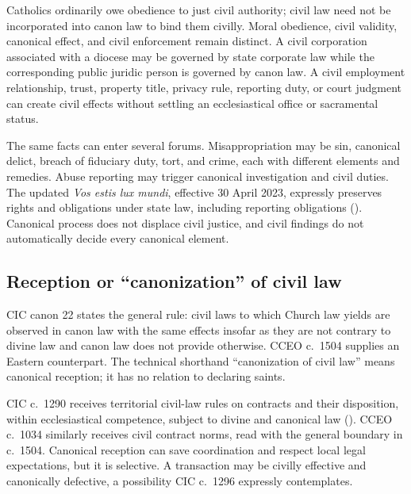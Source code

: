 Catholics ordinarily owe obedience to just civil authority; civil law need not be incorporated into canon law to bind them civilly. Moral obedience, civil validity, canonical effect, and civil enforcement remain distinct. A civil corporation associated with a diocese may be governed by state corporate law while the corresponding public juridic person is governed by canon law. A civil employment relationship, trust, property title, privacy rule, reporting duty, or court judgment can create civil effects without settling an ecclesiastical office or sacramental status.

The same facts can enter several forums. Misappropriation may be sin, canonical delict, breach of fiduciary duty, tort, and crime, each with different elements and remedies. Abuse reporting may trigger canonical investigation and civil duties. The updated \emph{Vos estis lux mundi}, effective 30 April 2023, expressly preserves rights and obligations under state law, including reporting obligations (). Canonical process does not displace civil justice, and civil findings do not automatically decide every canonical element.

\subsection{Reception or ``canonization'' of civil law}

CIC canon 22 states the general rule: civil laws to which Church law yields are observed in canon law with the same effects insofar as they are not contrary to divine law and canon law does not provide otherwise. CCEO c.~1504 supplies an Eastern counterpart. The technical shorthand ``canonization of civil law'' means canonical reception; it has no relation to declaring saints.

CIC c.~1290 receives territorial civil-law rules on contracts and their disposition, within ecclesiastical competence, subject to divine and canonical law (). CCEO c.~1034 similarly receives civil contract norms, read with the general boundary in c.~1504. Canonical reception can save coordination and respect local legal expectations, but it is selective. A transaction may be civilly effective and canonically defective, a possibility CIC c.~1296 expressly contemplates.

